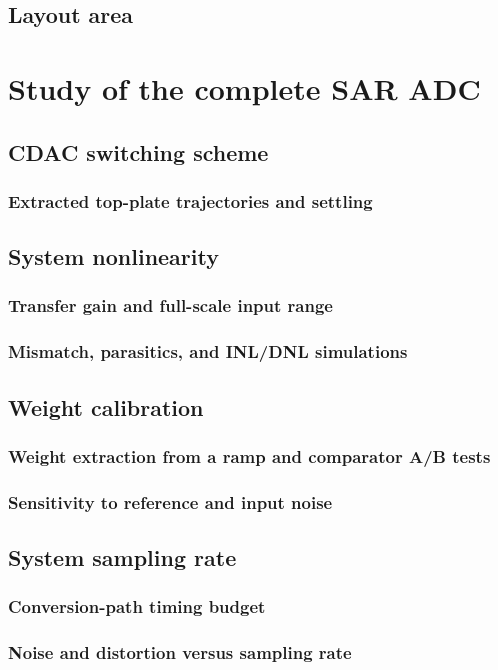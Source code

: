 \documentclass[PhD, UKenglish]{scrbook}
\begin{document}
\subsection{Layout area}

\clearpage

\section{Study of the complete SAR ADC}
\subsection{CDAC switching scheme}
\subsubsection{Extracted top-plate trajectories and settling}
\subsection{System nonlinearity}
\subsubsection{Transfer gain and full-scale input range}
\subsubsection{Mismatch, parasitics, and INL/DNL simulations}
\subsection{Weight calibration}
\subsubsection{Weight extraction from a ramp and comparator A/B tests}
\subsubsection{Sensitivity to reference and input noise}
\subsection{System sampling rate}
\subsubsection{Conversion-path timing budget}
\subsubsection{Noise and distortion versus sampling rate}
\end{document}
